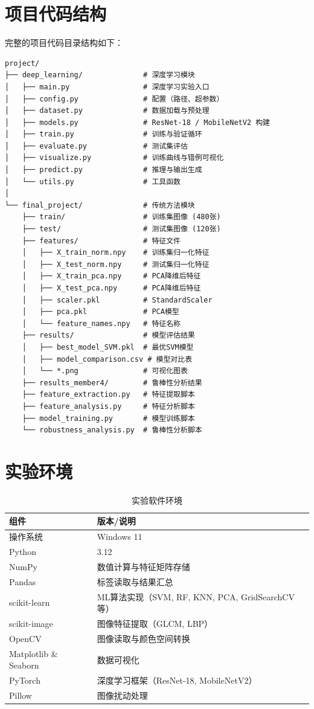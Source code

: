 \documentclass[UTF8,a4paper,12pt]{ctexart}
\numberwithin{figure}{section}
\numberwithin{table}{section}
\begin{document}
\appendix
\section{项目代码结构}

完整的项目代码目录结构如下：

{\small\begin{verbatim}
project/
├── deep_learning/              # 深度学习模块
│   ├── main.py                 # 深度学习实验入口
│   ├── config.py               # 配置（路径、超参数）
│   ├── dataset.py              # 数据加载与预处理
│   ├── models.py               # ResNet-18 / MobileNetV2 构建
│   ├── train.py                # 训练与验证循环
│   ├── evaluate.py             # 测试集评估
│   ├── visualize.py            # 训练曲线与错例可视化
│   ├── predict.py              # 推理与输出生成
│   └── utils.py                # 工具函数
│
└── final_project/              # 传统方法模块
    ├── train/                  # 训练集图像 (480张)
    ├── test/                   # 测试集图像 (120张)
    ├── features/               # 特征文件
    │   ├── X_train_norm.npy    # 训练集归一化特征
    │   ├── X_test_norm.npy     # 测试集归一化特征
    │   ├── X_train_pca.npy     # PCA降维后特征
    │   ├── X_test_pca.npy      # PCA降维后特征
    │   ├── scaler.pkl          # StandardScaler
    │   ├── pca.pkl             # PCA模型
    │   └── feature_names.npy   # 特征名称
    ├── results/                # 模型评估结果
    │   ├── best_model_SVM.pkl  # 最优SVM模型
    │   ├── model_comparison.csv # 模型对比表
    │   └── *.png               # 可视化图表
    ├── results_member4/        # 鲁棒性分析结果
    ├── feature_extraction.py   # 特征提取脚本
    ├── feature_analysis.py     # 特征分析脚本
    ├── model_training.py       # 模型训练脚本
    └── robustness_analysis.py  # 鲁棒性分析脚本
\end{verbatim}}

\section{实验环境}

\begin{table}[H]
\centering
\caption{实验软件环境}
\small
\begin{tabular}{lp{7cm}}
\toprule
\textbf{组件} & \textbf{版本/说明} \\
\midrule
操作系统 & Windows 11 \\
Python & 3.12 \\
NumPy & 数值计算与特征矩阵存储 \\
Pandas & 标签读取与结果汇总 \\
scikit-learn & ML算法实现（SVM, RF, KNN, PCA, GridSearchCV等） \\
scikit-image & 图像特征提取（GLCM, LBP） \\
OpenCV & 图像读取与颜色空间转换 \\
Matplotlib \& Seaborn & 数据可视化 \\
PyTorch & 深度学习框架（ResNet-18, MobileNetV2） \\
Pillow & 图像扰动处理 \\
\bottomrule
\end{tabular}
\end{table}
\end{document}
